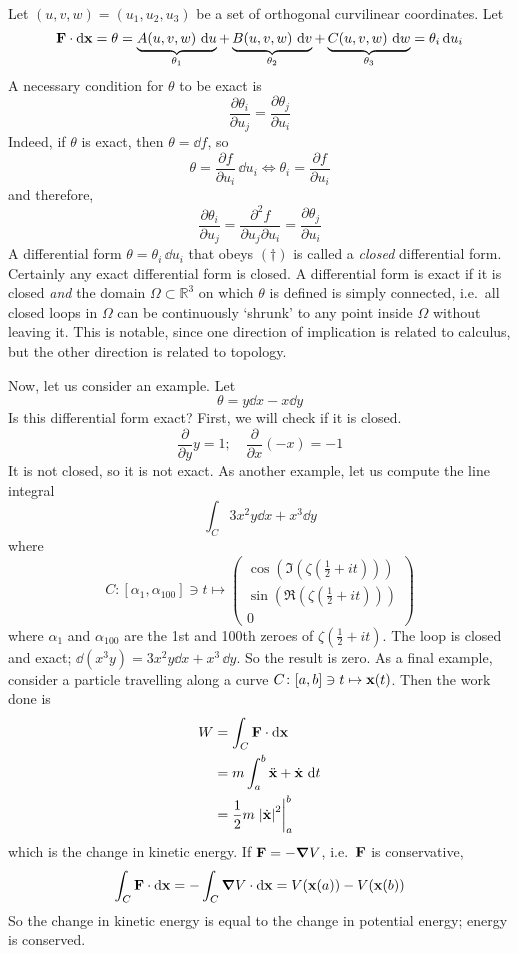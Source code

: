 Let \((u, v, w) = (u_1, u_2, u_3)\) be a set of orthogonal curvilinear coordinates.
Let
\[
	\vb F \cdot \dd \vb x = \theta = \underbrace{A(u, v, w) \, \dd{u}}_{\theta_1} + \underbrace{B(u, v, w) \, \dd{v}}_{\theta_2} + \underbrace{C(u, v, w) \, \dd{w}}_{\theta_3} = \theta_i \dd{u}_i
\]
A necessary condition for \(\theta\) to be exact is
\begin{equation}
	\frac{\partial \theta_i}{\partial u_j} = \frac{\partial \theta_j}{\partial u_i}
	\tag{\(\dagger\)}
\end{equation}
Indeed, if \(\theta\) is exact, then \(\theta = \dd{f}\), so
\[
	\theta = \frac{\partial f}{\partial u_i} \, \dd{u}_i \iff \theta_i = \frac{\partial f}{\partial u_i}
\]
and therefore,
\[
	\frac{\partial \theta_i}{\partial u_j} = \frac{\partial^2 f}{\partial u_j \partial u_i} = \frac{\partial \theta_j}{\partial u_i}
\]
A differential form \(\theta = \theta_i \, \dd{u}_i\) that obeys \((\dagger)\) is called a \textit{closed} differential form.
Certainly any exact differential form is closed.
A differential form is exact if it is closed \textit{and} the domain \(\Omega \subset \mathbb R^3\) on which \(\theta\) is defined is simply connected, i.e.\ all closed loops in \(\Omega\) can be continuously `shrunk' to any point inside \(\Omega\) without leaving it.
This is notable, since one direction of implication is related to calculus, but the other direction is related to topology.

Now, let us consider an example.
Let
\[
	\theta = y \dd{x} - x \dd{y}
\]
Is this differential form exact? First, we will check if it is closed.
\[
	\frac{\partial}{\partial y} y = 1;\quad \frac{\partial}{\partial x} (-x) = -1
\]
It is not closed, so it is not exact.
As another example, let us compute the line integral
\[
	\int_C 3x^2y\dd{x} + x^3\dd{y}
\]
where
\[
	C \colon [\alpha_1, \alpha_{100}] \ni t \mapsto \begin{pmatrix}
		\cos \left( \Im \left( \zeta \left( \frac{1}{2} + it \right) \right) \right) \\
		\sin \left( \Re \left( \zeta \left( \frac{1}{2} + it \right) \right) \right) \\
		0
	\end{pmatrix}
\]
where \(\alpha_1\) and \(\alpha_{100}\) are the 1st and 100th zeroes of \(\zeta \left( \frac{1}{2} + it \right)\).
The loop is closed and exact; \(\dd(x^3 y) = 3x^2 y \dd{x} + x^3 \, \dd{y}\).
So the result is zero.
As a final example, consider a particle travelling along a curve \(C \colon [a, b] \ni t \mapsto \vb x(t)\).
Then the work done is
\begin{align*}
	W & = \int_C \vb F \cdot \dd \vb x                    \\
	  & = m \int_a^b \ddot{\vb x} + \dot{\vb x} \, \dd{t} \\
	  & = \frac{1}{2}m \eval{\abs{\dot{\vb x}}^2}_a^b
\end{align*}
which is the change in kinetic energy.
If \(\vb F = -\grad V\), i.e.\ \(\vb F\) is conservative,
\[
	\int_C \vb F \cdot \dd \vb x = -\int_C \grad V \cdot \dd \vb x = V(\vb x(a)) - V(\vb x(b))
\]
So the change in kinetic energy is equal to the change in potential energy; energy is conserved.
